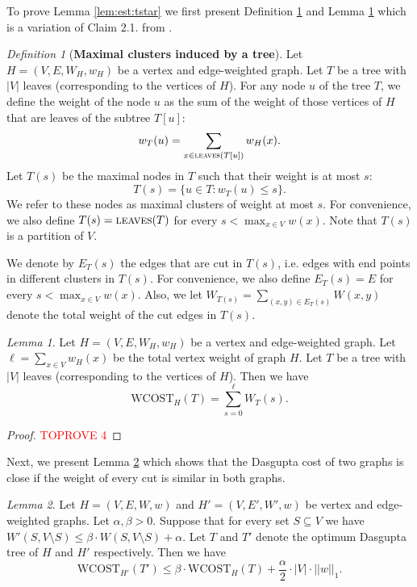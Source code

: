 \documentclass[letterpaper,11pt]{article}
\newcommand{\wCT}{\text{WCOST}}
\newcommand{\lv}{\textsc{leaves}}
\theoremstyle{plain}
\theoremstyle{definition}
\theoremstyle{remark}
\newtheorem{lemmma}{Lemma}
\newtheorem{mydef}{Definition}
\begin{document}
To prove Lemma \ref{lem:est:tstar} we first present Definition \ref{def:maximal:clusters} and Lemma \ref{lem:cut-opt} which is a variation of Claim 2.1. from \cite{charikar2017approximate}.


\begin{mydef}[\textbf{Maximal clusters induced by a tree}] \label{def:maximal:clusters}
	Let $H=(V,E,W_H,w_H)$ be a vertex and edge-weighted graph. Let $T$ be a  tree with $|V|$ leaves (corresponding to the vertices of $H$). For any node $u$ of the tree $T$, we define the  weight of the node $u$ as the sum of the weight of those vertices of $H$ that are leaves of the subtree $T[u]$: \[ w_T(u)=\sum_{x\in \lv(T[u])} w_H(x) \text{.}\] 
Let $T(s)$ be the maximal nodes in $T$ such that their weight is at most $s$:
\[T(s) =\{u\in T: w_T(u)\leq s\} \text{.}\]
We refer to these nodes as maximal clusters of weight at most $s$. For convenience, we also define $T(s) =\lv(T)$ for every $s<\max_{x\in V} w(x)$.  Note that $T(s)$ is a partition of $V$.

We denote by $E_T(s)$ the edges that are cut in $T(s)$, i.e. edges with end points in different clusters in $T(s)$. For convenience, we also define $E_T(s) =E$ for every $s<\max_{x\in V} w(x)$. 
Also, we let $W_{T(s)}=\sum_{(x,y)\in E_T(s)} W(x,y)$ denote the total weight of the cut edges in $T(s)$. 
\end{mydef}




\begin{lemmma} \label{lem:cut-opt}
	Let $H=(V,E,W_H,w_H)$ be a vertex and edge-weighted graph. Let $\ell=\sum_{x\in V} w_H(x)$ be the total vertex weight of graph $H$. Let $T$ be a tree with $|V|$ leaves (corresponding to the vertices of $H$).  Then we have 
\[\wCT_{H}(T) = \sum_{s=0}^{\ell} W_T(s) \text{.}\]
\end{lemmma}

\begin{proof}\textcolor{red}{TOPROVE 4}\end{proof}

Next, we present Lemma \ref{lem:cut-cost} which shows that the Dasgupta cost of two graphs is close if the weight of every cut is similar in both graphs.
\begin{lemmma}
	\label{lem:cut-cost}
	Let $H=(V,E, W, w)$ and $H'=(V, E', W', w)$ be vertex and edge-weighted graphs. Let $\alpha, \beta >0$. Suppose that for every set $S\subseteq V$ we have 
	$ W'(S,V\setminus S) \leq \beta \cdot W(S,V\setminus S) + \alpha$. Let $T$ and $T'$ denote the optimum Dasgupta tree of $H$ and 
	$H'$ respectively. Then we have
	\[ \wCT_{H'}(T') \leq \beta\cdot \wCT_{H}(T) + \frac{\alpha}{2} \cdot |V|\cdot ||w||_1 \text{.}\]
\end{lemmma}
\end{document}
